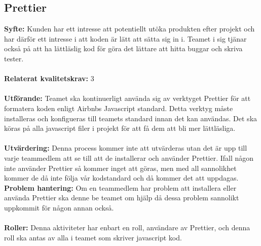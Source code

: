 \documentclass[10pt]{article}
\begin{document}
	
	
	\subsection{Prettier}
	\textbf{Syfte:}	Kunden har ett intresse att potentiellt utöka produkten efter projekt och har därför ett intresse i att koden är lätt att sätta sig in i. Teamet i sig tjänar också på att ha lättläslig kod för göra det lättare att hitta buggar och skriva tester.
	\\\\
	\textbf{Relaterat kvalitetskrav:} 3
	\\\\
	\textbf{Utförande:} Teamet ska kontinuerligt använda sig av verktyget Prettier för att formatera koden enligt Airbnbs Javascript standard\cite{bib-airbnb}. Detta verktyg måste installeras och konfigueras till teamets standard innan det kan användas. Det ska köras på alla javascript filer i projekt för att få dem att bli mer lättläsliga.
	\\\\
	\textbf{Utvärdering:} Denna process kommer inte att utvärderas utan det är upp till varje teammedlem att se till att de installerar och använder Prettier. Ifall någon inte använder Prettier så kommer inget att göras, men med all sannolikhet kommer de då inte följa vår kodstandard och då kommer det att uppdagas. 
	\textbf{Problem hantering:} Om en teammedlem har problem att installera eller använda Prettier ska denne be teamet om hjälp då dessa problem sannolikt uppkommit för någon annan också.
	\\\\
	\textbf{Roller:} Denna aktiviteter har enbart en roll, användare av Prettier, och denna roll ska antas av alla i teamet som skriver javascript kod.
	
	
\end{document}
